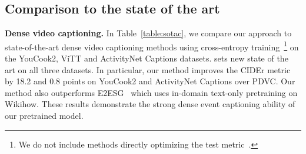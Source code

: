 \begin{table}[t]
\begin{center}
\setlength\tabcolsep{5pt}
\vspace{-0.3cm}
\caption{\small Comparison to the state of the art for event localization. * Results provided by the authors. $^\dag$ Results of our experiments using the official codebase.}  
\label{table:sotal}
\end{center}
\vspace{-0.9cm}
\end{table}

\subsection{Comparison to the state of the art}\label{sec:sota}
\noindent \textbf{Dense video captioning.} 
In Table~\ref{table:sotac}, we compare our approach to state-of-the-art dense video captioning methods using cross-entropy training~\footnote{We do not include methods directly optimizing the test metric~\cite{deng2021sketch, mun2019streamlined}.} on the YouCook2, ViTT and ActivityNet Captions datasets.
\model{} sets new state of the art on all three datasets.
In particular, our method improves the CIDEr metric by 18.2 and 0.8 points on YouCook2 and ActivityNet Captions over PDVC.
Our method also outperforms E2ESG~\cite{zhu2022end} which uses in-domain text-only pretraining on Wikihow.
These results demonstrate the strong dense event captioning ability of our pretrained \model{} model.

